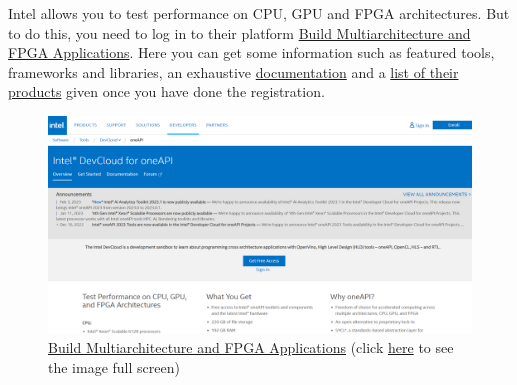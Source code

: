 \documentclass[a4paper]{article}
\begin{document}
    Intel allows you to test performance on CPU, GPU and FPGA architectures. But to do this, you need to log in to their platform \href{https://devcloud.intel.com/oneapi/home/}{Build Multiarchitecture and FPGA Applications}. Here you can get some information such as featured tools, frameworks and libraries, an exhaustive \href{https://devcloud.intel.com/oneapi/documentation/shell-commands/}{documentation} and a \href{https://devcloud.intel.com/oneapi/get_started/}{list of their products} given once you have done the registration.

    \begin{figure}[!htp]
        \centering
        \includegraphics[width=\textwidth]{img/Intel_DevCloud_for_oneAPI.png}
        \caption{\href{https://devcloud.intel.com/oneapi/home/}{Build Multiarchitecture and FPGA Applications} (click \href{https://github.com/AndreVale69/FPGA-project-presentation/tree/main/document/ENG-version/img/Intel_DevCloud_for_oneAPI.png}{here} to see the image full screen)}
    \end{figure}
\end{document}
